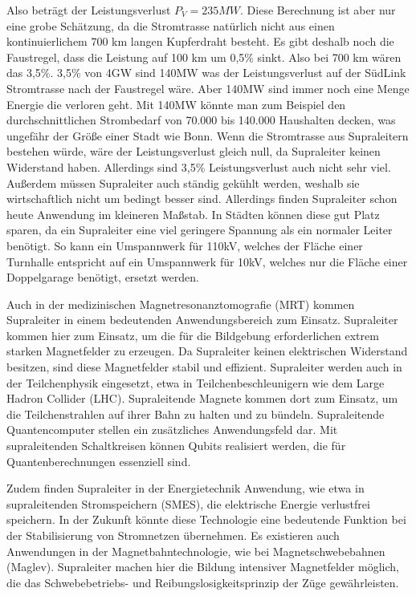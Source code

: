 Also beträgt der Leistungsverlust $P_V = 235MW$. Diese Berechnung ist aber nur eine grobe Schätzung, da die Stromtrasse natürlich 
nicht aus einen kontinuierlichem 700 km langen Kupferdraht besteht. Es gibt deshalb noch die Faustregel, dass die Leistung auf 
100 km um 0,5\% sinkt. Also bei 700 km wären das 3,5\%. 3,5\% von 4GW sind 140MW was der Leistungsverlust auf der SüdLink Stromtrasse
nach der Faustregel wäre. Aber 140MW sind immer noch eine Menge Energie die verloren geht. Mit 140MW könnte man zum Beispiel
den durchschnittlichen Strombedarf von 70.000 bis 140.000 Haushalten decken, was ungefähr der Größe einer Stadt wie Bonn.
Wenn die Stromtrasse aus Supraleitern bestehen würde, wäre der Leistungsverlust gleich null, da Supraleiter keinen Widerstand haben.
Allerdings sind 3,5\% Leistungsverlust auch nicht sehr viel. Außerdem müssen Supraleiter auch ständig gekühlt werden, weshalb sie 
wirtschaftlich nicht um bedingt besser sind. Allerdings finden Supraleiter schon heute Anwendung im kleineren Maßstab. In
Städten können diese gut Platz sparen, da ein Supraleiter eine viel geringere Spannung als ein normaler Leiter benötigt.
So kann ein Umspannwerk für 110kV, welches der Fläche einer Turnhalle entspricht auf ein Umspannwerk für 10kV, welches nur die
Fläche einer Doppelgarage benötigt, ersetzt werden. 

Auch in der medizinischen Magnetresonanztomografie (MRT) kommen Supraleiter in einem bedeutenden Anwendungsbereich zum Einsatz. Supraleiter kommen hier zum Einsatz, um die für die Bildgebung erforderlichen extrem starken Magnetfelder zu erzeugen. Da Supraleiter keinen elektrischen Widerstand besitzen, sind diese Magnetfelder stabil und effizient. 
Supraleiter werden auch in der Teilchenphysik eingesetzt, etwa in Teilchenbeschleunigern wie dem Large Hadron Collider (LHC). Supraleitende Magnete kommen dort zum Einsatz, um die Teilchenstrahlen auf ihrer Bahn zu halten und zu bündeln.
Supraleitende Quantencomputer stellen ein zusätzliches Anwendungsfeld dar. Mit supraleitenden Schaltkreisen können Qubits realisiert werden, die für Quantenberechnungen essenziell sind. 

Zudem finden Supraleiter in der Energietechnik Anwendung, wie etwa in supraleitenden Stromspeichern (SMES), die elektrische Energie verlustfrei speichern. In der Zukunft könnte diese Technologie eine bedeutende Funktion bei der Stabilisierung von Stromnetzen übernehmen. 
Es existieren auch Anwendungen in der Magnetbahntechnologie, wie bei Magnetschwebebahnen (Maglev). Supraleiter machen hier die Bildung intensiver Magnetfelder möglich, die das Schwebebetriebs- und Reibungslosigkeitsprinzip der Züge gewährleisten. 
